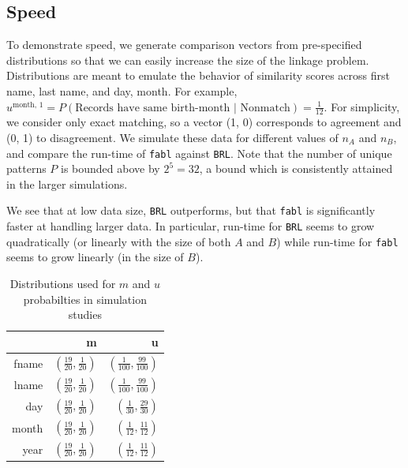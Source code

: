 \documentclass[12pt,letterpaper]{article}
\newcommand{\1}[1]{\mathbb{I}\!\left[#1\right]} %
\begin{document}
\hypertarget{speed}{%
	\subsection{Speed}\label{speed}}


To demonstrate speed, we generate comparison vectors from pre-specified
distributions so that we can easily increase the size of the linkage
problem. Distributions are meant to emulate the behavior of similarity
scores across first name, last name, and day, month. For example, $u^{\text{month, 1}} = P(\text{Records have same birth-month | Nonmatch}) = \frac{1}{12}$. For simplicity, we
consider only exact matching, so a vector (1, 0) corresponds to
agreement and (0, 1) to disagreement. We simulate these data for
different values of \(n_A\) and \(n_B\), and compare the run-time of
\texttt{fabl} against \texttt{BRL}. Note that the number of unique
patterns \(P\) is bounded above by \(2^5 = 32\), a bound which is
consistently attained in the larger simulations.

We see that at low data size, \texttt{BRL} outperforms, but that
\texttt{fabl} is significantly faster at handling larger data. In
particular, run-time for \texttt{BRL} seems to grow quadratically (or
linearly with the size of both \(A\) and \(B\)) while run-time for
\texttt{fabl} seems to grow linearly (in the size of \(B\)).

\begin{table}[h!]
	\centering
	\begin{tabular}{rrr}
		\hline
		& m & u \\ 
		\hline
		fname & $\left(\frac{19}{20}, \frac{1}{20}\right)$ & $\left(\frac{1}{100}, \frac{99}{100}\right)$ \\ 
		lname & $\left(\frac{19}{20}, \frac{1}{20}\right)$ & $\left(\frac{1}{100}, \frac{99}{100}\right)$ \\ 
		day & $\left(\frac{19}{20}, \frac{1}{20}\right)$ & $\left(\frac{1}{30}, \frac{29}{30}\right)$ \\ 
		month & $\left(\frac{19}{20}, \frac{1}{20}\right)$ & $\left(\frac{1}{12}, \frac{11}{12}\right)$ \\ 
		year & $\left(\frac{19}{20}, \frac{1}{20}\right)$ & $\left(\frac{1}{12}, \frac{11}{12}\right)$ \\ 
		\hline
	\end{tabular}
\caption{Distributions used for $m$ and $u$ probabilties in simulation studies}\label{Tab:distributions}
\end{table}
\end{document}
